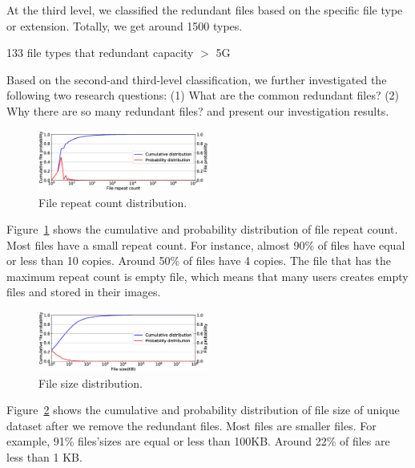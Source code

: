 At the third level, we classified the redundant files based on the specific file type or extension. Totally, we get around 1500 types. 

133 file types that redundant capacity $>$ 5G 

Based on the second-and third-level classification, we further investigated the following two research questions: (1) What are the common redundant files?
(2) Why there are so many redundant files? and present our investigation results.

\begin{figure}
	\centering
	\includegraphics[width=0.5\textwidth]{graphs/File_repeat_count.eps}
	\caption{File repeat count distribution.
	}
	\label{fig:file-repeat-cnt}
\end{figure}

Figure~\ref{fig:file-repeat-cnt} shows the cumulative and probability distribution of file repeat count. 
Most files have a small repeat count. For instance, almost 90\% of files have equal or less than 10 copies. Around 50\% of files have 4 copies.
The file that has the maximum repeat count is empty file, which means that many users creates empty files and stored in their images.

\begin{figure}
	\centering
	\includegraphics[width=0.5\textwidth]{graphs/File_size-KB.eps}
	\caption{File size distribution.
	}
	\label{fig:file-size}
\end{figure}

Figure~\ref{fig:file-size} shows the cumulative and probability distribution of file size of unique dataset after we remove the redundant files.
Most files are smaller files. For example, 91\% files'sizes are equal or less than 100KB. 
Around 22\% of files are less than 1 KB.
 

